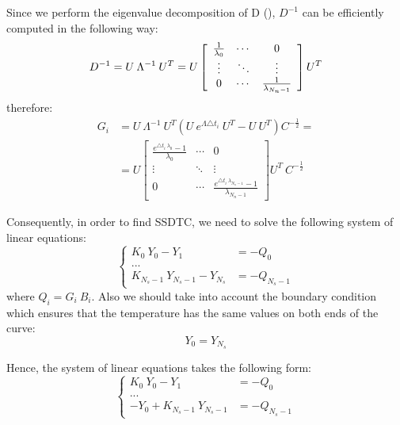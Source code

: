 Since we perform the eigenvalue decomposition of D (), $D^{-1}$ can be efficiently computed in the following way:
\[
  D^{-1} = U \: \Lambda^{-1} \: U^T = U \left[
      \begin{array}{ccc}
        \frac{1}{\lambda_0} & \cdots & 0 \\
        \vdots & \ddots & \vdots \\
        0 & \cdots & \frac{1}{\lambda_{N_n - 1}}
      \end{array}
    \right] U^T \\
\]
therefore:
\begin{align*}
  G_i & = U \: \Lambda^{-1} \: U^T \left(U \: e^{\Lambda \triangle t_i} \: U^T - U \: U^T \right) C^{-\frac{1}{2}} = \\
      & = U \left[
        \begin{array}{ccc}
          \frac{e^{\triangle t_i \: \lambda_0} - 1}{\lambda_0} & \cdots & 0 \\
          \vdots & \ddots & \vdots \\
          0 & \cdots & \frac{e^{\triangle t_i \: \lambda_{N_n - 1}} - 1}{\lambda_{N_n - 1}}
        \end{array}
      \right] U^T \: C^{-\frac{1}{2}}
\end{align*}

Consequently, in order to find SSDTC, we need to solve the following system of linear equations:
\[
  \begin{cases}
    K_0 \: Y_0 - Y_1 & = -Q_0 \\
    ... \\
    K_{N_s - 1} \: Y_{N_s - 1} - Y_{N_s} & = -Q_{N_s - 1}
  \end{cases}
\]
where $Q_i = G_i \: B_i$. Also we should take into account the boundary condition which ensures that the temperature has the same values on both ends of the curve:
\begin{equation} \label{eq:boundary-condition}
  Y_0 = Y_{N_s}
\end{equation}

Hence, the system of linear equations takes the following form:
\[
  \begin{cases}
    K_0 \: Y_0 - Y_1 & = -Q_0 \\
    ... \\
    -Y_0 + K_{N_s - 1} \: Y_{N_s - 1} & = -Q_{N_s - 1}
  \end{cases}
\]

